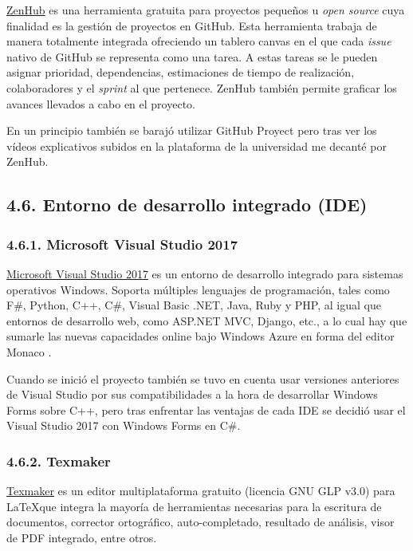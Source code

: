 \href{https://www.zenhub.com/}{ZenHub} es una herramienta gratuita para proyectos pequeños u \textit{open source} cuya finalidad es la gestión de proyectos en GitHub. Esta herramienta trabaja de manera totalmente integrada ofreciendo un tablero canvas en el que cada \textit{issue} nativo de GitHub se representa como una tarea. A estas tareas se le pueden asignar prioridad, dependencias, estimaciones de tiempo de realización, colaboradores y el \textit{sprint} al que pertenece. ZenHub también permite graficar los avances llevados a cabo en el proyecto.


En un principio también se barajó utilizar GitHub Proyect pero tras ver los vídeos explicativos subidos en la plataforma de la universidad me decanté por ZenHub.

\subsection{4.6. Entorno de desarrollo integrado (IDE)}

\subsubsection{4.6.1. Microsoft Visual Studio 2017}

\href{https://visualstudio.microsoft.com/es/vs/}{Microsoft Visual Studio 2017} es un entorno de desarrollo integrado para sistemas operativos Windows. Soporta múltiples lenguajes de programación, tales como F\#, Python, C++, C\#, Visual Basic .NET, Java, Ruby y PHP, al igual que entornos de desarrollo web, como ASP.NET MVC, Django, etc., a lo cual hay que sumarle las nuevas capacidades online bajo Windows Azure en forma del editor Monaco \cite{wiki:visualstudio}.

Cuando se inició el proyecto también se tuvo en cuenta usar versiones anteriores de Visual Studio por sus compatibilidades a la hora de desarrollar Windows Forms sobre C++, pero tras enfrentar las ventajas de cada IDE se decidió usar el Visual Studio 2017 con Windows Forms en C\#.

\subsubsection{4.6.2. Texmaker}

\href{http://www.xm1math.net/texmaker/}{Texmaker} es un editor multiplataforma gratuito (licencia GNU GLP v3.0) para \LaTeX que integra la mayoría de herramientas necesarias para la escritura de documentos, corrector ortográfico, auto-completado, resultado de análisis, visor de PDF integrado, entre otros.

